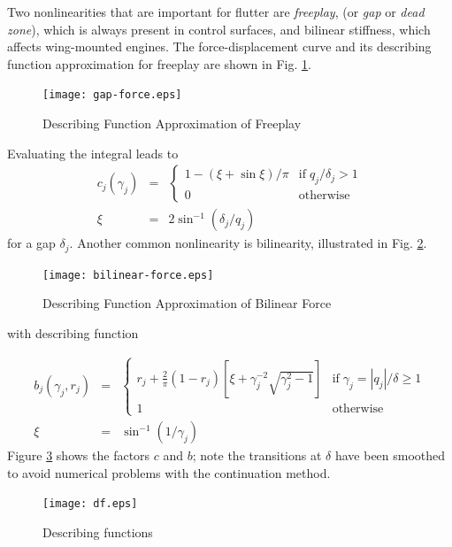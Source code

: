 \documentclass[11pt,openany,twoside]{book}
\numberwithin{equation}{section}		%
\newcommand{\Newterm}[1]{{\em #1}}
\newcommand{\Figref}[1]{Fig. \ref{#1}}  %
\begin{document}
Two nonlinearities that are important for flutter are \Newterm{freeplay},
(or \Newterm{gap} or \Newterm{dead zone}),
which is always present in control surfaces, and bilinear stiffness,
which affects wing-mounted engines.
The force-displacement curve and its describing function approximation
for freeplay are shown in \Figref{fig:gap-force}.
\begin{figure}[ht] 	%
		\texttt{[image: gap-force.eps]}
	\centering
	\caption{Describing Function Approximation of Freeplay}\label{fig:gap-force}
\end{figure}
Evaluating the integral leads to
\begin{eqnarray}
\label{eqn:gap}
c_j(\gamma_j)  & = &
	\begin{cases}
		1 - (\xi + \sin{\xi})/\pi &
			\text{if} \; q_j/\delta_j > 1 \nonumber \\
		0 & \text{otherwise}
	\end{cases} \\
	\xi & = & 2\sin^{-1}(\delta_j/q_j)
\end{eqnarray}
for a gap $\delta_j$. Another common nonlinearity is bilinearity,
illustrated in \Figref{fig:bilinear-force}.
\begin{figure}[!ht]	%
		\texttt{[image: bilinear-force.eps]}
	\centering
	\caption{Describing Function Approximation of Bilinear Force}\label{fig:bilinear-force}
\end{figure}
with describing function

\begin{eqnarray}
\label{eqn:bilinear}
b_j(\gamma_j,r_j) & = &
	\begin{cases}
		r_j + \frac{2}{\pi} (1 - r_j) \left[ \xi + \gamma_j^{-2} \sqrt{\gamma_j^2 - 1} \right] & \text{if} \; \gamma_j = |q_j|/\delta \ge 1 \\
		1 & \text{otherwise}
	\end{cases} \\
	\xi & = & \sin^{-1}(1/\gamma_j)
\end{eqnarray}
Figure \ref{fig:df} shows the factors $c$ and $b$; note the transitions
at $\delta$ have been smoothed to avoid numerical problems with the
continuation method.
\begin{figure}[!ht]	%
	\texttt{[image: df.eps]}
\centering
\caption{Describing functions}\label{fig:df}
\end{figure}
\end{document}
